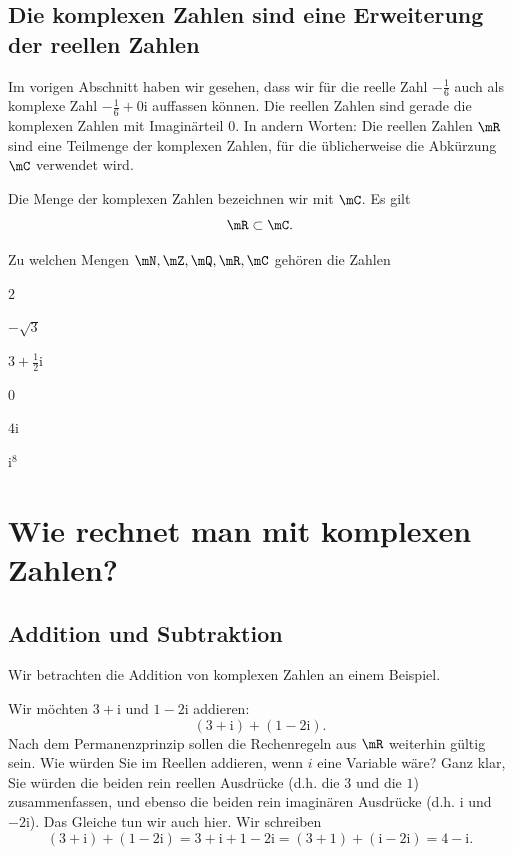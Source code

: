 \documentclass[%
11pt,%
twoside,%
titlepage,%
german,%
headsepline%
]{scrartcl}
\begin{document}
\subsection{Die komplexen Zahlen sind eine Erweiterung der reellen Zahlen}

Im vorigen Abschnitt haben wir gesehen, dass wir f\"ur die reelle Zahl $-\frac{1}{6}$ auch als komplexe Zahl $-\frac{1}{6}+0\mathrm{i}$ auffassen k\"onnen. Die reellen Zahlen sind gerade die komplexen Zahlen mit Imaginärteil $0$. In andern Worten: Die reellen Zahlen $\mR$ sind eine Teilmenge der komplexen Zahlen, f\"ur die \"ublicherweise die Abk\"urzung $\mC$ verwendet wird.

\begin{bem}
Die Menge der komplexen Zahlen bezeichnen wir mit $\mC$. Es gilt
$$\mR\subset\mC.$$
\end{bem}

\begin{ueb}[Zahlenmengen]
Zu welchen Mengen $\mN,\mZ,\mQ,\mR,\mC$ geh\"oren die Zahlen

\begin{minipage}{0.3\textwidth}
\begin{enumeratea}
\item $2$
\item $-\sqrt{3}$
\item $3+\frac{1}{2}\mathrm{i}$
\end{enumeratea}
\end{minipage}
\begin{minipage}{0.4\textwidth}
\begin{enumeratea}
\setcounter{enumi}{3}
\item $0$
\item $4\mathrm{i}$
\item $\mathrm{i}^8$
\end{enumeratea}
\end{minipage}
\end{ueb}

\section{Wie rechnet man mit komplexen Zahlen?}
\subsection{Addition und Subtraktion}

Wir betrachten die Addition von komplexen Zahlen an einem Beispiel.

\begin{bsp}
Wir m\"ochten $3+\mathrm{i}$ und $1-2\mathrm{i}$ addieren:
$$(3+\mathrm{i})+(1-2\mathrm{i}).$$
Nach dem Permanenzprinzip sollen die Rechenregeln aus $\mR$ weiterhin g\"ultig sein. Wie w\"urden Sie im Reellen addieren, wenn $i$ eine Variable wäre? Ganz klar, Sie w\"urden die beiden rein reellen Ausdr\"ucke (d.h. die $3$ und die $1$) zusammenfassen, und ebenso die beiden rein imaginären Ausdr\"ucke (d.h. $\mathrm{i}$ und $-2\mathrm{i}$). Das Gleiche tun wir auch hier. Wir schreiben
$$
(3+\mathrm{i})+(1-2\mathrm{i})=3+\mathrm{i}+1-2\mathrm{i}=(3+1)+(\mathrm{i}-2\mathrm{i})=4-\mathrm{i}.
$$
\end{bsp}
\end{document}
